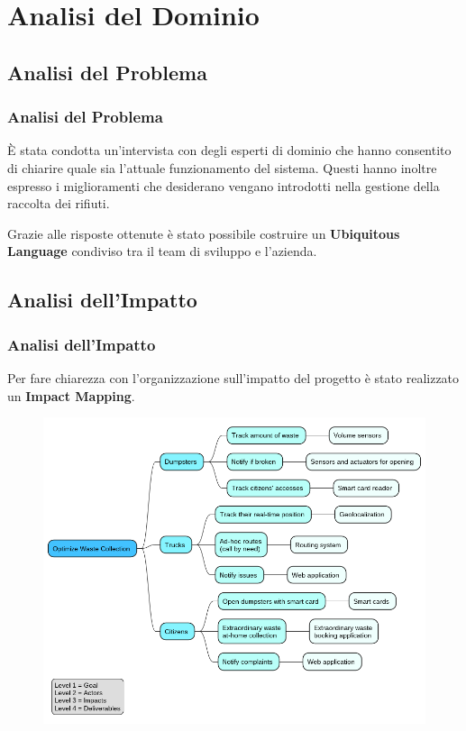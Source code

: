 \section{Analisi del Dominio}
\frame{\tableofcontents[currentsection]}


\subsection{Analisi del Problema}

\begin{frame}
    \frametitle{Analisi del Problema}
    È stata condotta un'intervista con degli esperti di dominio che hanno consentito di chiarire quale sia l'attuale
    funzionamento del sistema.
    Questi hanno inoltre espresso i miglioramenti che desiderano vengano introdotti nella gestione della raccolta dei
    rifiuti.

    \bigskip

    Grazie alle risposte ottenute è stato possibile costruire un \textbf{Ubiquitous Language} condiviso tra il team di sviluppo
    e l'azienda.

\end{frame}

\subsection{Analisi dell'Impatto}

\begin{frame}
    \frametitle{Analisi dell'Impatto}
    Per fare chiarezza con l'organizzazione sull'impatto del progetto è stato realizzato un \textbf{Impact Mapping}.

    \smallskip

    \begin{figure}[H]
        \centering
        \includegraphics[width=0.7\linewidth]{../img/impact-mapping}
    \end{figure}

\end{frame}

